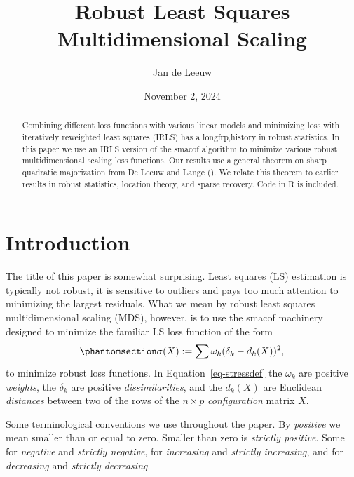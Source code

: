 \documentclass[
  12pt,
  letterpaper,
  DIV=11,
  numbers=noendperiod]{scrartcl}
\title{Robust Least Squares Multidimensional Scaling}
\author{Jan de Leeuw}
\date{November 2, 2024}
\newcommand{\sectionbreak}{\pagebreak}
\renewcommand*\contentsname{Table of contents}
\newcommand\contentsname{Table of contents}
\theoremstyle{definition}
\theoremstyle{definition}
\theoremstyle{plain}
\theoremstyle{plain}
\theoremstyle{plain}
\theoremstyle{remark}
\begin{document}
\maketitle
\begin{abstract}
Combining different loss functions with various linear models and
minimizing loss with iteratively reweighted least squares (IRLS) has a
longfrp,history in robust statistics. In this paper we use an IRLS
version of the smacof algorithm to minimize various robust
multidimensional scaling loss functions. Our results use a general
theorem on sharp quadratic majorization from De Leeuw and Lange
(). We relate this theorem to
earlier results in robust statistics, location theory, and sparse
recovery. Code in R is included.
\end{abstract}

\renewcommand*\contentsname{Table of contents}
{
\hypersetup{linkcolor=}
\setcounter{tocdepth}{3}
\tableofcontents
}

\sectionbreak

\listoffigures

\sectionbreak

\section{Introduction}\label{sec-intro}

The title of this paper is somewhat surprising. Least squares (LS)
estimation is typically not robust, it is sensitive to outliers and pays
too much attention to minimizing the largest residuals. What we mean by
robust least squares multidimensional scaling (MDS), however, is to use
the smacof machinery designed to minimize the familiar LS loss function
of the form \begin{equation}\phantomsection\label{eq-stressdef}{
\sigma(X):=\sum\omega_k(\delta_k-d_k(X))^2,
}\end{equation} to minimize robust loss functions. In
Equation~\ref{eq-stressdef} the \(\omega_k\) are positive
\emph{weights}, the \(\delta_k\) are positive \emph{dissimilarities},
and the \(d_k(X)\) are Euclidean \emph{distances} between two of the
rows of the \(n\times p\) \emph{configuration} matrix \(X\).

Some terminological conventions we use throughout the paper. By
\emph{positive} we mean smaller than or equal to zero. Smaller than zero
is \emph{strictly positive}. Some for \emph{negative} and \emph{strictly
negative}, for \emph{increasing} and \emph{strictly increasing}, and for
\emph{decreasing} and \emph{strictly decreasing}.
\end{document}
